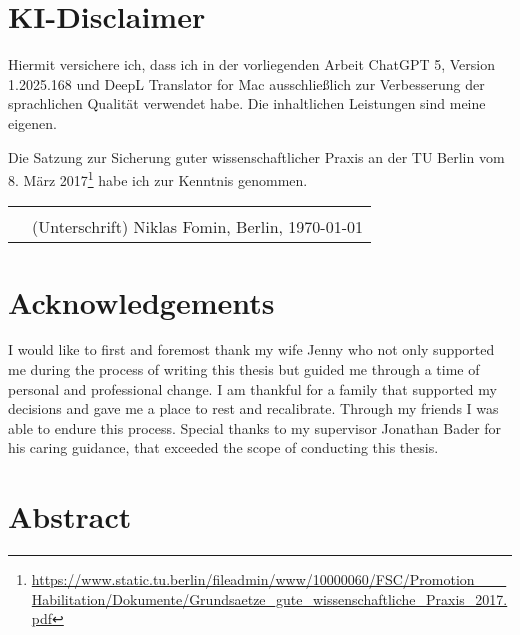 \documentclass[a4paper, 11pt]{article}
\newcommand{\authors}{Niklas Fomin}
\begin{document}

\clearpage
\pagestyle{plain}

\newpage

\section*{KI-Disclaimer}
Hiermit versichere ich, dass ich in der vorliegenden Arbeit ChatGPT 5, Version 1.2025.168 und DeepL Translator for Mac ausschließlich zur Verbesserung der sprachlichen Qualität verwendet habe. Die inhaltlichen Leistungen sind meine eigenen.

Die Satzung zur Sicherung guter wissenschaftlicher Praxis an der TU Berlin vom 8. März 2017\footnote{\url{https://www.static.tu.berlin/fileadmin/www/10000060/FSC/Promotion___Habilitation/Dokumente/Grundsaetze_gute_wissenschaftliche_Praxis_2017.pdf}} habe ich zur Kenntnis genommen.

\vskip 2cm
\begin{tabular}{@{}p{.5in}p{4in}@{}}
     & \hrulefill                              \\
     & (Unterschrift) \authors, Berlin, \today \\
\end{tabular}


\newpage

\section*{Acknowledgements}
I would like to first and foremost thank my wife Jenny who not only supported me during the process of writing this thesis but guided me through a time of personal and professional change. I am thankful for a family that supported my decisions and gave me a place to rest and recalibrate. Through my friends I was able to endure this process.
Special thanks to my supervisor Jonathan Bader for his caring guidance, that exceeded the scope of conducting this thesis.



\newpage
\section*{Abstract}
\end{document}
